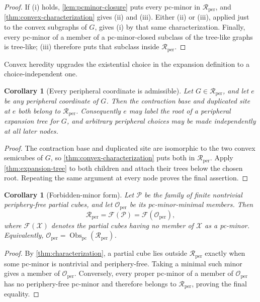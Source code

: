 \documentclass[11pt]{article}
\newtheorem{corollary}[theorem]{Corollary}
\theoremstyle{definition}
\theoremstyle{remark}
\newcommand{\Rper}{\mathcal R_{\mathrm{per}}}
\newcommand{\Oper}{\mathcal O_{\mathrm{per}}}
\newcommand{\Obs}{\operatorname{Obs}_{\mathrm{pc}}}
\newcommand{\calF}{\mathcal F}
\begin{document}
\begin{proof}
If (i) holds, \cref{lem:pcminor-closure} puts every pc-minor in \(\Rper\),
and \cref{thm:convex-characterization} gives (ii) and (iii).
Either (ii) or (iii), applied just to the convex subgraphs of \(G\),
gives (i) by that same characterization. Finally, every pc-minor of a
member of a pc-minor-closed subclass of the tree-like graphs is tree-like;
(iii) therefore puts that subclass inside \(\Rper\).
\end{proof}

Convex heredity upgrades the existential choice in the expansion
definition to a choice-independent one.

\begin{corollary}[Every peripheral coordinate is admissible]
\label{cor:every-periphery-admissible}
Let \(G\in\Rper\), and let \(e\) be any peripheral coordinate of \(G\).
Then the contraction base and duplicated site at \(e\) both belong to
\(\Rper\).  Consequently \(e\) may label the root of a peripheral expansion
tree for \(G\), and arbitrary peripheral choices may be made independently
at all later nodes.
\end{corollary}

\begin{proof}
The contraction base and duplicated site are isomorphic to the two
convex semicubes of \(G\), so \cref{thm:convex-characterization} puts both
in \(\Rper\).  Apply
\cref{thm:expansion-tree} to both children and attach their trees below the
chosen root.  Repeating the same argument at every node proves the final
assertion.
\end{proof}

\begin{corollary}[Forbidden-minor form]
\label{cor:forbidden-form}
Let \(\mathcal P\) be the family of finite nontrivial periphery-free partial
cubes, and let \(\Oper\) be its pc-minor-minimal members.  Then
\[
 \Rper=\calF(\mathcal P)=\calF(\Oper),
\]
where \(\calF(\mathcal X)\) denotes the partial cubes having no member of
\(\mathcal X\) as a pc-minor.  Equivalently,
\(\Oper=\Obs(\Rper)\).
\end{corollary}

\begin{proof}
By \cref{thm:characterization}, a partial cube lies outside \(\Rper\) exactly
when some pc-minor is nontrivial and periphery-free.  Taking a minimal such
minor gives a member of \(\Oper\).  Conversely, every proper pc-minor of a
member of \(\Oper\) has no periphery-free pc-minor and therefore belongs to
\(\Rper\), proving the final equality.
\end{proof}
\end{document}
